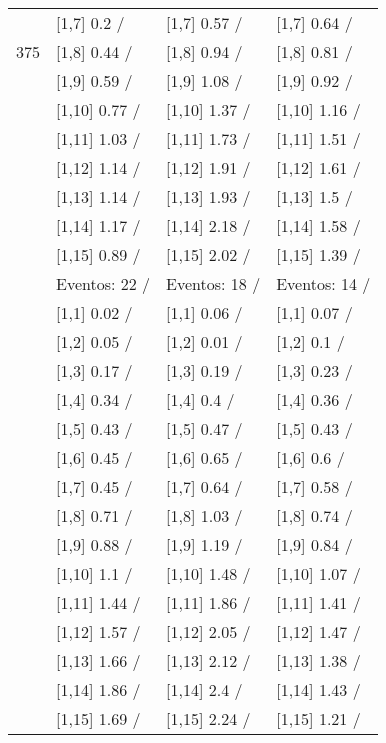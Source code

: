 \begin{table}
\begin{tabular}[t]{llll}
 & {}[1,7] 0.2  / & {}[1,7] 0.57  / & {}[1,7] 0.64  /\\
375 & {}[1,8] 0.44  / & {}[1,8] 0.94  / & {}[1,8] 0.81  /\\
\addlinespace
 & {}[1,9] 0.59  / & {}[1,9] 1.08  / & {}[1,9] 0.92  /\\
 & {}[1,10] 0.77  / & {}[1,10] 1.37  / & {}[1,10] 1.16  /\\
 & {}[1,11] 1.03  / & {}[1,11] 1.73  / & {}[1,11] 1.51  /\\
 & {}[1,12] 1.14  / & {}[1,12] 1.91  / & {}[1,12] 1.61  /\\
 & {}[1,13] 1.14  / & {}[1,13] 1.93  / & {}[1,13] 1.5  /\\
\addlinespace
 & {}[1,14] 1.17  / & {}[1,14] 2.18  / & {}[1,14] 1.58  /\\
 & {}[1,15] 0.89  / & {}[1,15] 2.02  / & {}[1,15] 1.39  /\\
 & Eventos:  22 / & Eventos:  18 / & Eventos:  14 /\\
 & {}[1,1] 0.02  / & {}[1,1] 0.06  / & {}[1,1] 0.07  /\\
 & {}[1,2] 0.05  / & {}[1,2] 0.01  / & {}[1,2] 0.1  /\\
\addlinespace
 & {}[1,3] 0.17  / & {}[1,3] 0.19  / & {}[1,3] 0.23  /\\
 & {}[1,4] 0.34  / & {}[1,4] 0.4  / & {}[1,4] 0.36  /\\
 & {}[1,5] 0.43  / & {}[1,5] 0.47  / & {}[1,5] 0.43  /\\
 & {}[1,6] 0.45  / & {}[1,6] 0.65  / & {}[1,6] 0.6  /\\
 & {}[1,7] 0.45  / & {}[1,7] 0.64  / & {}[1,7] 0.58  /\\
\addlinespace
500 & {}[1,8] 0.71  / & {}[1,8] 1.03  / & {}[1,8] 0.74  /\\
 & {}[1,9] 0.88  / & {}[1,9] 1.19  / & {}[1,9] 0.84  /\\
 & {}[1,10] 1.1  / & {}[1,10] 1.48  / & {}[1,10] 1.07  /\\
 & {}[1,11] 1.44  / & {}[1,11] 1.86  / & {}[1,11] 1.41  /\\
 & {}[1,12] 1.57  / & {}[1,12] 2.05  / & {}[1,12] 1.47  /\\
\addlinespace
 & {}[1,13] 1.66  / & {}[1,13] 2.12  / & {}[1,13] 1.38  /\\
 & {}[1,14] 1.86  / & {}[1,14] 2.4  / & {}[1,14] 1.43  /\\
 & {}[1,15] 1.69  / & {}[1,15] 2.24  / & {}[1,15] 1.21  /\\
\bottomrule
\end{tabular}
\end{table}
